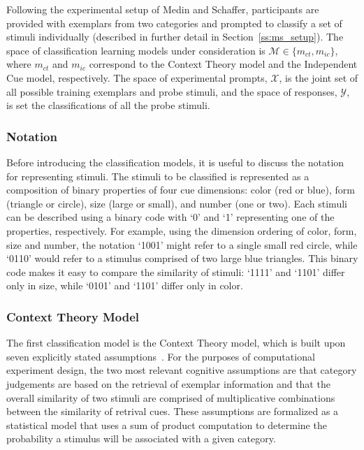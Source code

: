 \documentclass[11pt]{article}
\begin{document}
Following the experimental setup of Medin and Schaffer, participants are provided with exemplars from two categories and prompted to classify a set of stimuli individually (described in further detail in Section~\ref{ss:ms_setup}). The space of classification learning models under consideration is $\mathcal{M} \in \{m_{ct}, m_{ic}\}$, where $m_{ct}$ and $m_{ic}$ correspond to the Context Theory model and the Independent Cue model, respectively. The space of experimental prompts, $\mathcal{X}$, is the joint set of all possible training exemplars and probe stimuli, and the space of responses, $\mathcal{Y}$, is set the classifications of all the probe stimuli.

\subsubsection{Notation}

Before introducing the classification models, it is useful to discuss the notation for representing stimuli. The stimuli to be classified is represented as a composition of binary properties of four cue dimensions: color (red or blue), form (triangle or circle), size (large or small), and number (one or two). Each stimuli can be described using a binary code with `0' and `1' representing one of the properties, respectively. For example, using the dimension ordering of color, form, size and number, the notation `1001' might refer to a single small red circle, while `0110' would refer to a stimulus comprised of two large blue triangles. This binary code makes it easy to compare the similarity of stimuli: `1111' and `1101' differ only in size, while `0101' and `1101' differ only in color. 

\subsubsection{Context Theory Model}

The first classification model is the Context Theory model, which is built upon seven explicitly stated assumptions~\cite{medin78:pr}. For the purposes of computational experiment design, the two most relevant cognitive assumptions are that category judgements are based on the retrieval of exemplar information and that the overall similarity of two stimuli are comprised of multiplicative combinations between the similarity of retrival cues. These assumptions are formalized as a statistical model that uses a sum of product computation to determine the probability a stimulus will be associated with a given category.
\end{document}
